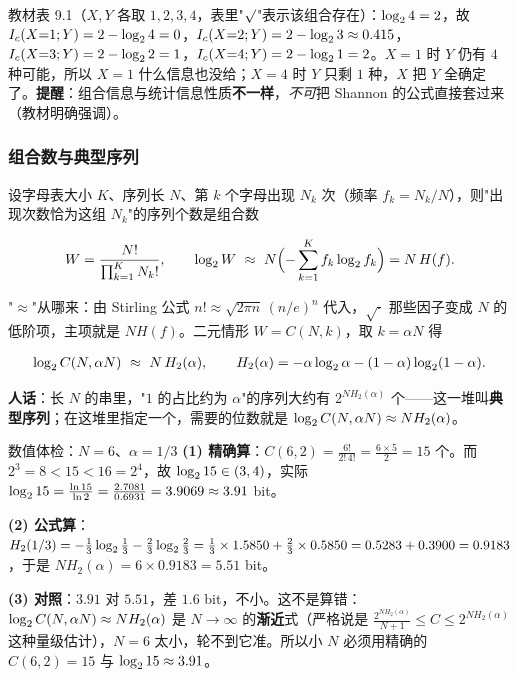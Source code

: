 教材表 9.1（$X,Y$ 各取 $1,2,3,4$，表里"$\surd$"表示该组合存在）：$\log_{2} 4=2$，故 $I_c(X{=}1;Y)=2-\log_{2} 4=0$，$I_c(X{=}2;Y)=2-\log_{2} 3\approx0.415$，$I_c(X{=}3;Y)=2-\log_{2} 2=1$，$I_c(X{=}4;Y)=2-\log_{2} 1=2$。$X=1$ 时 $Y$ 仍有 $4$ 种可能，所以 $X=1$ 什么信息也没给；$X=4$ 时 $Y$ 只剩 $1$ 种，$X$ 把 $Y$ 全确定了。\textbf{提醒}：组合信息与统计信息性质\textbf{不一样}，\emph{不可}把 Shannon 的公式直接套过来（教材明确强调）。

\subsubsection{组合数与典型序列}

设字母表大小 $K$、序列长 $N$、第 $k$ 个字母出现 $N_k$ 次（频率 $f_k=N_k/N$），则"出现次数恰为这组 $N_k$"的序列个数是组合数

\begin{align*}
W=\frac{N!}{\prod_{k=1}^{K}N_k!},
\qquad
\log_{2} W\ \approx\ N\Bigl(-\sum_{k=1}^{K}f_k\log_{2} f_k\Bigr)=N\,H(f).
\end{align*}

"$\approx$"从哪来：由 Stirling 公式 $n!\approx\sqrt{2\pi n}\,(n/e)^n$ 代入，$\sqrt{\cdot}$ 那些因子变成 $N$ 的低阶项，主项就是 $N H(f)$。二元情形 $W=C(N,k)$，取 $k=\alpha N$ 得

\begin{align*}
\log_{2} C(N,\alpha N)\ \approx\ N\,H_2(\alpha),\qquad
H_2(\alpha)=-\alpha\log_{2}\alpha-(1-\alpha)\log_{2}(1-\alpha).
\end{align*}

\textbf{人话}：长 $N$ 的串里，"$1$ 的占比约为 $\alpha$"的序列大约有 $2^{NH_2(\alpha)}$ 个——这一堆叫\textbf{典型序列}；在这堆里指定一个，需要的位数就是 $\log_{2} C(N,\alpha N)\approx N H_2(\alpha)$。

\begin{calc}{数值体检：$N=6$、$\alpha=1/3$}
\textbf{(1) 精确算}：$C(6,2)=\frac{6!}{2!\,4!}=\frac{6\times5}{2}=15$ 个。而 $2^3=8<15<16=2^4$，故 $\log_{2} 15\in(3,4)$，实际 $\log_{2} 15=\frac{\ln15}{\ln2}=\frac{2.7081}{0.6931}=3.9069\approx3.91$ bit。

\textbf{(2) 公式算}：$H_2(1/3)=-\frac13\log_{2}\frac13-\frac23\log_{2}\frac23=\frac13\times1.5850+\frac23\times0.5850=0.5283+0.3900=0.9183$，于是 $N H_2(\alpha)=6\times0.9183=5.51$ bit。

\textbf{(3) 对照}：$3.91$ 对 $5.51$，差 $1.6$ bit，不小。这不是算错：$\log_{2} C(N,\alpha N)\approx NH_2(\alpha)$ 是 $N\to\infty$ 的\textbf{渐近}式（严格说是 $\frac{2^{NH_2(\alpha)}}{N+1}\le C\le 2^{NH_2(\alpha)}$ 这种量级估计），$N=6$ 太小，轮不到它准。所以小 $N$ 必须用精确的 $C(6,2)=15$ 与 $\log_{2} 15\approx3.91$。
\end{calc}

